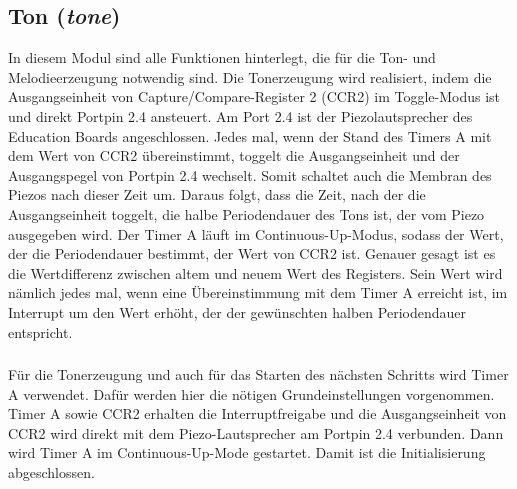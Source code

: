 \subsection{Ton (\emph{tone})} %
\label{sub:ton}
In diesem Modul sind alle Funktionen hinterlegt, die für die Ton- und Melodieerzeugung notwendig sind.
Die Tonerzeugung wird realisiert, indem die Ausgangseinheit von Capture/Compare-Register 2 (CCR2) im Toggle-Modus ist und direkt Portpin 2.4 ansteuert. Am Port 2.4 ist der Piezolautsprecher des Education Boards angeschlossen. Jedes mal, wenn der Stand des Timers A mit dem Wert von CCR2 übereinstimmt, toggelt die Ausgangseinheit und der Ausgangspegel von Portpin 2.4 wechselt. Somit schaltet auch die Membran des Piezos nach dieser Zeit um. Daraus folgt, dass die Zeit, nach der die Ausgangseinheit toggelt, die halbe Periodendauer des Tons ist, der vom Piezo ausgegeben wird. Der Timer A läuft im Continuous-Up-Modus, sodass der Wert, der die Periodendauer bestimmt, der Wert von CCR2 ist. Genauer gesagt ist es die Wertdifferenz zwischen altem und neuem Wert des Registers. Sein Wert wird nämlich jedes mal, wenn eine Übereinstimmung mit dem Timer A erreicht ist, im Interrupt um den Wert erhöht, der der gewünschten halben Periodendauer entspricht.

\subsubsection{} %
\label{ssub:void_ton_init}
Für die Tonerzeugung und auch für das Starten des nächsten Schritts wird Timer A verwendet. Dafür werden hier die nötigen Grundeinstellungen vorgenommen. Timer A sowie CCR2 erhalten die Interruptfreigabe und die Ausgangseinheit von CCR2 wird direkt mit dem Piezo-Lautsprecher am Portpin 2.4 verbunden. Dann wird Timer A im Continuous-Up-Mode gestartet. Damit ist die Initialisierung abgeschlossen.

